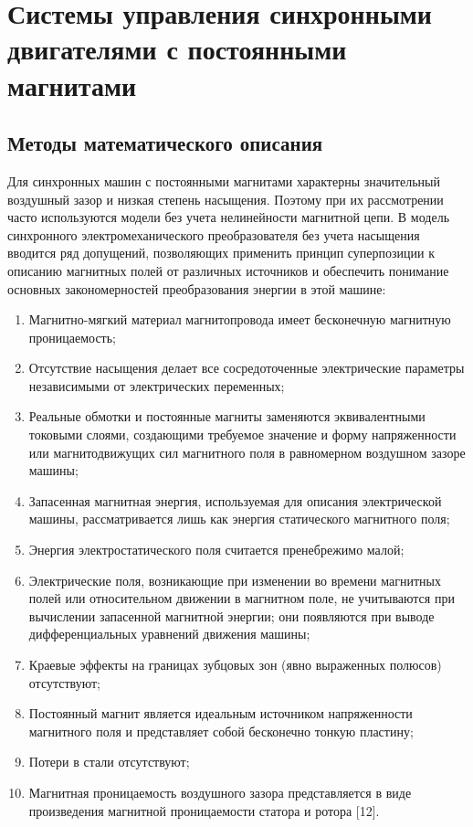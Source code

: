 \chapter{Системы управления синхронными двигателями с постоянными магнитами} \label{ch:ch2}

\section{Методы математического описания} \label{sec:ch2/sec1}
Для синхронных машин с постоянными магнитами характерны значительный воздушный зазор и низкая степень насыщения. Поэтому при их рассмотрении часто используются модели без учета нелинейности магнитной цепи.
В модель синхронного электромеханического преобразователя без учета насыщения вводится ряд допущений, позволяющих применить принцип суперпозиции к описанию магнитных полей от различных источников и обеспечить понимание основных закономерностей преобразования энергии в
этой машине:
\begin{enumerate}
\item Магнитно-мягкий материал магнитопровода имеет
бесконечную магнитную проницаемость;
\item Отсутствие насыщения делает все сосредоточенные электрические параметры независимыми от электрических
переменных;
\item Реальные обмотки и постоянные магниты заменяются эквивалентными токовыми слоями, создающими требуемое значение и форму напряженности или магнитодвижущих сил магнитного поля в равномерном воздушном зазоре машины;
\item Запасенная магнитная энергия, используемая для описания электрической машины, рассматривается лишь как энергия статического магнитного поля;
\item Энергия электростатического поля считается пренебрежимо
малой;
\item Электрические поля, возникающие при изменении во времени магнитных полей или относительном движении в магнитном поле, не учитываются при вычислении запасенной магнитной энергии; они появляются при выводе дифференциальных уравнений движения машины;
\item Краевые эффекты на границах зубцовых зон (явно выраженных полюсов) отсутствуют;
\item Постоянный магнит является идеальным источником напряженности магнитного поля и представляет собой бесконечно тонкую пластину;
\item Потери в стали отсутствуют;
\item Магнитная проницаемость воздушного зазора представляется в виде произведения магнитной проницаемости статора и ротора [12].
\end{enumerate}

